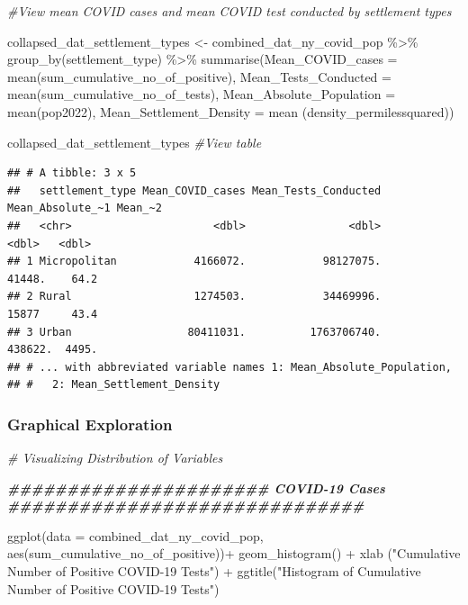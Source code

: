 \documentclass[
  12pt,
]{article}
\newenvironment{Shaded}{\begin{snugshade}}{\end{snugshade}}
\newcommand{\AttributeTok}[1]{\textcolor[rgb]{0.77,0.63,0.00}{#1}}
\newcommand{\CommentTok}[1]{\textcolor[rgb]{0.56,0.35,0.01}{\textit{#1}}}
\newcommand{\DocumentationTok}[1]{\textcolor[rgb]{0.56,0.35,0.01}{\textbf{\textit{#1}}}}
\newcommand{\FunctionTok}[1]{\textcolor[rgb]{0.00,0.00,0.00}{#1}}
\newcommand{\NormalTok}[1]{#1}
\newcommand{\OtherTok}[1]{\textcolor[rgb]{0.56,0.35,0.01}{#1}}
\newcommand{\SpecialCharTok}[1]{\textcolor[rgb]{0.00,0.00,0.00}{#1}}
\newcommand{\StringTok}[1]{\textcolor[rgb]{0.31,0.60,0.02}{#1}}
\begin{document}
\begin{Shaded}
\begin{Highlighting}[]
\CommentTok{\#View mean COVID cases and mean COVID test conducted by settlement types}


\NormalTok{collapsed\_dat\_settlement\_types }\OtherTok{\textless{}{-}}\NormalTok{ combined\_dat\_ny\_covid\_pop }\SpecialCharTok{\%\textgreater{}\%}
  \FunctionTok{group\_by}\NormalTok{(settlement\_type) }\SpecialCharTok{\%\textgreater{}\%}
  \FunctionTok{summarise}\NormalTok{(}\AttributeTok{Mean\_COVID\_cases =} \FunctionTok{mean}\NormalTok{(sum\_cumulative\_no\_of\_positive),}
            \AttributeTok{Mean\_Tests\_Conducted =} \FunctionTok{mean}\NormalTok{(sum\_cumulative\_no\_of\_tests),}
            \AttributeTok{Mean\_Absolute\_Population =} \FunctionTok{mean}\NormalTok{(pop2022),}
            \AttributeTok{Mean\_Settlement\_Density =} \FunctionTok{mean}\NormalTok{ (density\_permilessquared))}

\NormalTok{collapsed\_dat\_settlement\_types }\CommentTok{\#View table}
\end{Highlighting}
\end{Shaded}

\begin{verbatim}
## # A tibble: 3 x 5
##   settlement_type Mean_COVID_cases Mean_Tests_Conducted Mean_Absolute_~1 Mean_~2
##   <chr>                      <dbl>                <dbl>            <dbl>   <dbl>
## 1 Micropolitan            4166072.            98127075.           41448.    64.2
## 2 Rural                   1274503.            34469996.           15877     43.4
## 3 Urban                  80411031.          1763706740.          438622.  4495. 
## # ... with abbreviated variable names 1: Mean_Absolute_Population,
## #   2: Mean_Settlement_Density
\end{verbatim}

\hypertarget{graphical-exploration}{%
\subsubsection{Graphical Exploration}\label{graphical-exploration}}

\begin{Shaded}
\begin{Highlighting}[]
\CommentTok{\# Visualizing Distribution of Variables}

\DocumentationTok{\#\#\#\#\#\#\#\#\#\#\#\#\#\#\#\#\#\#\#\#\#\# COVID{-}19 Cases \#\#\#\#\#\#\#\#\#\#\#\#\#\#\#\#\#\#\#\#\#\#\#\#\#\#\#\#\#\#}

\FunctionTok{ggplot}\NormalTok{(}\AttributeTok{data =}\NormalTok{ combined\_dat\_ny\_covid\_pop, }\FunctionTok{aes}\NormalTok{(sum\_cumulative\_no\_of\_positive))}\SpecialCharTok{+}
  \FunctionTok{geom\_histogram}\NormalTok{() }\SpecialCharTok{+}
  \FunctionTok{xlab}\NormalTok{ (}\StringTok{"Cumulative Number of Positive COVID{-}19 Tests"}\NormalTok{) }\SpecialCharTok{+}
  \FunctionTok{ggtitle}\NormalTok{(}\StringTok{"Histogram of Cumulative Number of Positive COVID{-}19 Tests"}\NormalTok{)}
\end{Highlighting}
\end{Shaded}
\end{document}

